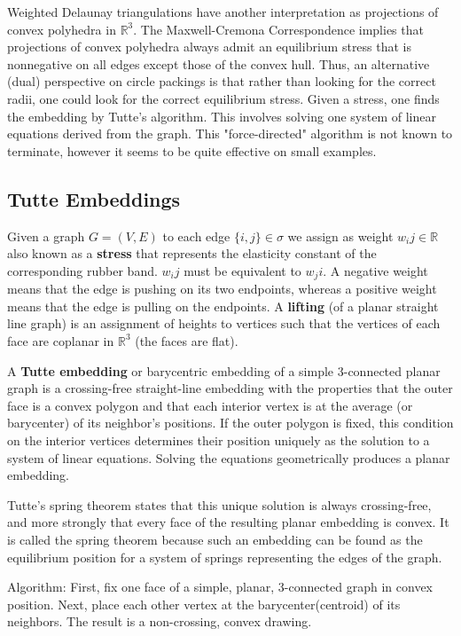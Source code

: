 \documentclass[11pt]{article}
\newcommand{\R}{\mathbb{R}}
\begin{document}
    Weighted Delaunay triangulations have another interpretation as projections of convex polyhedra in $\R^3$. The Maxwell-Cremona Correspondence implies that projections of convex polyhedra always admit an equilibrium stress that is nonnegative on all edges except those of the convex hull. Thus, an alternative (dual) perspective on circle packings is that rather than looking for the correct radii, one could look for the correct equilibrium stress. Given a stress, one finds the embedding by Tutte's algorithm. This involves solving one system of linear equations derived from the graph. This "force-directed" algorithm is not known to terminate, however it seems to be quite effective on small examples. 

\subsection{Tutte Embeddings}
 Given a graph $G=(V,E)$ to each edge $\{i,j\}\in\sigma$ we assign as weight $w_ij\in\R$ also known as a \textbf{stress} that represents the elasticity constant of the corresponding rubber band. $w_ij$ must be equivalent to $w_ji$. A negative weight means that the edge is pushing on its two endpoints, whereas a positive weight means that the edge is pulling on the endpoints. 
 A \textbf{lifting} (of a planar straight line graph) is an assignment of heights to vertices such that the vertices of each face are coplanar in $\R^3$ (the faces are flat).
  
  A \textbf{Tutte embedding} or barycentric embedding of a simple 3-connected planar graph is a crossing-free straight-line embedding with the properties that the outer face is a convex polygon and that each interior vertex is at the average (or barycenter) of its neighbor's positions. If the outer polygon is fixed, this condition on the interior vertices determines their position uniquely as the solution to a system of linear equations. Solving the equations geometrically produces a planar embedding. 
  
  Tutte's spring theorem states that this unique solution is always crossing-free, and more strongly that every face of the resulting planar embedding is convex. It is called the spring theorem because such an embedding can be found as the equilibrium position for a system of springs representing the edges of the graph.
  
  Algorithm: First, fix one face of a simple, planar, 3-connected graph in convex position. Next, place each other vertex at the barycenter(centroid) of its neighbors. The result is a non-crossing, convex drawing.
 
\end{document}
